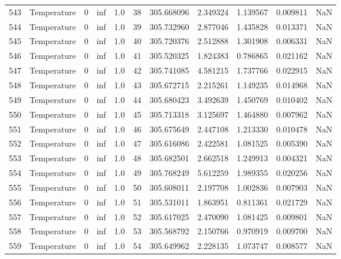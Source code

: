 \begin{tabular}{llrrrrrrrrr}
543 &  Temperature &       0 &  inf &  1.0 &   38 &  305.668096 &  2.349324 &  1.139567 &   0.009811 &      NaN \\
544 &  Temperature &       0 &  inf &  1.0 &   39 &  305.732960 &  2.877046 &  1.435828 &   0.013371 &      NaN \\
545 &  Temperature &       0 &  inf &  1.0 &   40 &  305.720376 &  2.512888 &  1.301908 &   0.006331 &      NaN \\
546 &  Temperature &       0 &  inf &  1.0 &   41 &  305.520325 &  1.824383 &  0.786865 &   0.021162 &      NaN \\
547 &  Temperature &       0 &  inf &  1.0 &   42 &  305.741085 &  4.581215 &  1.737766 &   0.022915 &      NaN \\
548 &  Temperature &       0 &  inf &  1.0 &   43 &  305.672715 &  2.215261 &  1.149235 &   0.014968 &      NaN \\
549 &  Temperature &       0 &  inf &  1.0 &   44 &  305.680423 &  3.492639 &  1.450769 &   0.010402 &      NaN \\
550 &  Temperature &       0 &  inf &  1.0 &   45 &  305.713318 &  3.125697 &  1.464880 &   0.007962 &      NaN \\
551 &  Temperature &       0 &  inf &  1.0 &   46 &  305.675649 &  2.447108 &  1.213330 &   0.010478 &      NaN \\
552 &  Temperature &       0 &  inf &  1.0 &   47 &  305.616086 &  2.422581 &  1.081525 &   0.005390 &      NaN \\
553 &  Temperature &       0 &  inf &  1.0 &   48 &  305.682501 &  2.662518 &  1.249913 &   0.004321 &      NaN \\
554 &  Temperature &       0 &  inf &  1.0 &   49 &  305.768249 &  5.612259 &  1.989355 &   0.020256 &      NaN \\
555 &  Temperature &       0 &  inf &  1.0 &   50 &  305.608011 &  2.197708 &  1.002836 &   0.007903 &      NaN \\
556 &  Temperature &       0 &  inf &  1.0 &   51 &  305.531011 &  1.863951 &  0.811361 &   0.021729 &      NaN \\
557 &  Temperature &       0 &  inf &  1.0 &   52 &  305.617025 &  2.470090 &  1.081425 &   0.009801 &      NaN \\
558 &  Temperature &       0 &  inf &  1.0 &   53 &  305.568792 &  2.150766 &  0.970919 &   0.009700 &      NaN \\
559 &  Temperature &       0 &  inf &  1.0 &   54 &  305.649962 &  2.228135 &  1.073747 &   0.008577 &      NaN \\

\end{tabular}
